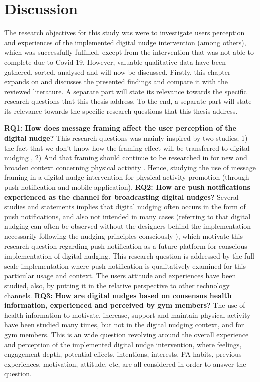 \chapter{Discussion}
The research objectives for this study was were to investigate users perception and experiences of the implemented digital nudge intervention (among others), which was successfully fulfilled, except from the intervention that was not able to complete due to Covid-19. However, valuable qualitative data have been gathered, sorted, analysed and will now be discussed. Firstly, this chapter expands on and discusses the presented findings and compare it with the reviewed literature. A separate part will state its relevance towards the specific research questions that this thesis address. To the end, a separate part will state its relevance towards the specific research questions that this thesis address.  

\bigbreak
\textbf{RQ1: How does message framing affect the user perception of the digital nudge?}
\bigbreak
This research questions was mainly inspired by two studies; 1) the fact that we don't know how the framing effect will be transferred to digital nudging \cite{mirsch_digital_2017}, 2) And that framing should continue to be researched in for new and broaden context concerning physical activity 
\cite{williams_effects_2019}. Hence, studying the use of message framing in a digital nudge intervention for physical activity promotion (through push notification and mobile application). 
\bigbreak
\textbf{RQ2: How are push notifications experienced as the channel for broadcasting digital nudges?}
\bigbreak
Several studies and statements implies that digital nudging often occurs in the form of push notifications, and also not intended in many cases (referring to that digital nudging can often be observed without the designers behind the implementation necessarily following the nudging principles consciously \cite{mirsch_making_2018}), which motivate this research question regarding push notification as a future platform for conscious implementation of digital nudging. This research question is addressed by the full scale implementation where push notification is qualitatively examined for this particular usage and context. The users attitude and experiences have been studied, also, by putting it in the relative perspective to other technology channels. 
\bigbreak
\textbf{RQ3: How are digital nudges based on consensus health information, experienced and perceived by gym members? }
\bigbreak
The use of health information to motivate, increase, support and maintain physical activity have been studied many times, but not in the digital nudging context, and for gym members. This is an wide question revolving around the overall experience and perception of the implemented digital nudge intervention, where feelings, engagement depth, potential effects, intentions, interests, PA habits, previous experiences, motivation, attitude, etc, are all considered in order to answer the question. 


